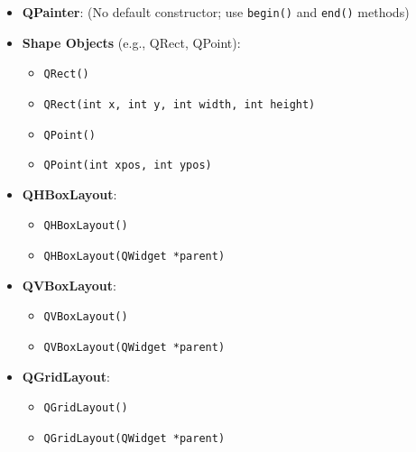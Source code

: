 \documentclass{report}
\begin{document}
\begin{itemize}
        \item \textbf{QPainter}: (No default constructor; use \texttt{begin()} and \texttt{end()} methods)

        \item \textbf{Shape Objects} (e.g., QRect, QPoint):
        \begin{itemize}
            \item \texttt{QRect()}
            \item \texttt{QRect(int x, int y, int width, int height)}
            \item \texttt{QPoint()}
            \item \texttt{QPoint(int xpos, int ypos)}
        \end{itemize}

        \item \textbf{QHBoxLayout}:
        \begin{itemize}
            \item \texttt{QHBoxLayout()}
            \item \texttt{QHBoxLayout(QWidget *parent)}
        \end{itemize}

        \item \textbf{QVBoxLayout}:
        \begin{itemize}
            \item \texttt{QVBoxLayout()}
            \item \texttt{QVBoxLayout(QWidget *parent)}
        \end{itemize}

        \item \textbf{QGridLayout}:
        \begin{itemize}
            \item \texttt{QGridLayout()}
            \item \texttt{QGridLayout(QWidget *parent)}
        \end{itemize}
    \end{itemize}
\end{document}
